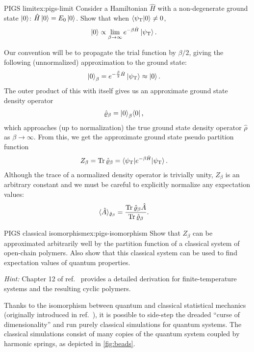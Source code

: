 \begin{DefExercise}{PIGS limit}{ex:pigs-limit}
	Consider a Hamiltonian $\hat{H}$ with a non-degenerate ground state $\ket{0}$: $\hat{H} \ket{0} = E_0 \ket{0}$.
	Show that when $\braket{\psi_\mathrm{T} | 0} \ne 0$,
	\begin{align}
		\ket{0}
		&\propto \lim_{\beta \to \infty} e^{-\beta \hat{H}} \ket{\psi_\mathrm{T}}.
	\end{align}
\end{DefExercise}

Our convention will be to propagate the trial function by $\beta/2$, giving the following (unnormalized) approximation to the ground state:
\begin{align}
	\ket{0}_\beta
	&= e^{-\frac{\beta}{2} \hat{H}} \ket{\psi_\mathrm{T}}
	\approx \ket{0}.
\end{align}
The outer product of this with itself gives us an approximate ground state density operator
\begin{align}
	\hat{\varrho}_\beta
	&= \ket{0}_\beta\!\bra{0},
\end{align}
which approaches (up to normalization) the true ground state density operator $\hat{\rho}$ as $\beta \to \infty$.
From this, we get the approximate ground state pseudo partition function
\begin{align}
	Z_\beta
	&= \operatorname{Tr}{\hat{\varrho}_\beta}
	= \braket{\psi_\mathrm{T} | e^{-\beta \hat{H}} | \psi_\mathrm{T}}.
\end{align}
Although the trace of a normalized density operator is trivially unity, $Z_\beta$ is an arbitrary constant and we must be careful to explicitly normalize any expectation values:
\begin{align}
	\langle \hat{A} \rangle_{\hat{\varrho}_\beta}
	&= \frac{\operatorname{Tr}{\hat{\varrho}_\beta \hat{A}}}{\operatorname{Tr}{\hat{\varrho}_\beta}}.
\end{align}

\begin{DefExercise}{PIGS classical isomorphism}{ex:pigs-isomorphism}
	Show that $Z_\beta$ can be approximated arbitrarily well by the partition function of a classical system of open-chain polymers.
	Also show that this classical system can be used to find expectation values of quantum properties.

	\textit{Hint:} Chapter 12 of ref.~\cite{tuckerman2010statistical} provides a detailed derivation for finite-temperature systems and the resulting cyclic polymers.
\end{DefExercise}

Thanks to the isomorphism between quantum and classical statistical mechanics (originally introduced in ref.~\cite{chandler1981exploiting}), it is possible to side-step the dreaded ``curse of dimensionality'' and run purely classical simulations for quantum systems.
The classical simulations consist of many copies of the quantum system coupled by harmonic springs, as depicted in \cref{fig:beads}.

